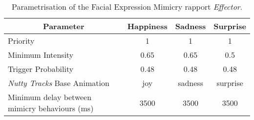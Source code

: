 \begin{table}[H]
	\centering
	\begin{tabular}{|l|c|c|c|}
	\hline
	\multicolumn{1}{|c|}{\textbf{Parameter}} & \textbf{Happiness} & \textbf{Sadness} & \textbf{Surprise} \\ \hline
		Priority & 1 & 1 & 1 \\ \hline
		Minimum Intensity & 0.65 & 0.65 & 0.5 \\ \hline
		Trigger Probability & 0.48 & 0.48 & 0.48 \\ \thickhline
		\textit{Nutty Tracks} Base Animation & joy & sadness & surprise \\ \hline
		Minimum delay between mimicry behaviours (ms) & 3500 & 3500 & 3500 \\ \hline	
	\end{tabular}
	\caption{Parametrisation of the Facial Expression Mimicry rapport \textit{Effector}. }
	\label{table:facialMimicryParametersValues}
\end{table}

